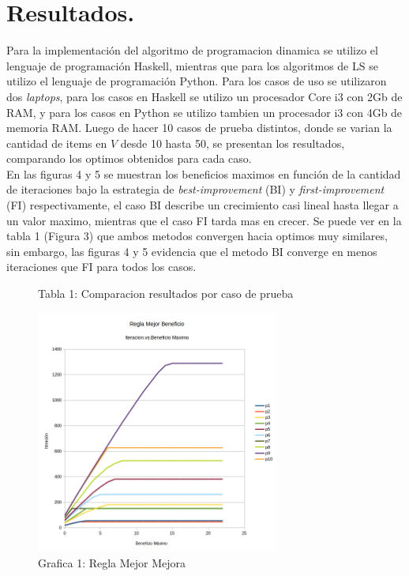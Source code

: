 \documentclass{ci5652}
\begin{document}
\section{Resultados.}
	Para la implementación del algoritmo de programacion dinamica se utilizo el lenguaje de programación Haskell, mientras que para los algoritmos de LS se utilizo el lenguaje de programación Python. Para los casos de uso se utilizaron dos \textit{laptops}, para los casos en Haskell se utilizo un procesador Core i3 con 2Gb de RAM, y para los casos en Python se utilizo tambien un procesador i3 con 4Gb de memoria RAM. Luego de hacer 10 casos de prueba distintos, donde se varian la cantidad de items en $V$ desde 10 hasta 50, se presentan los resultados, comparando los optimos obtenidos para cada caso.\\
	En las figuras 4 y 5 se muestran los beneficios maximos en función de la cantidad de iteraciones bajo la estrategia de \textit{best-improvement} (BI) y \textit{first-improvement} (FI) respectivamente, el caso BI describe un crecimiento casi lineal hasta llegar a un valor maximo, mientras que el caso FI tarda mas en crecer. Se puede ver en la tabla 1 (Figura 3) que ambos metodos convergen hacia optimos muy similares, sin embargo, las figuras 4 y 5 evidencia que el metodo BI converge en menos iteraciones que FI para todos los casos.

 	\begin{figure}[h]
	 	\caption{Tabla 1: Comparacion resultados por caso de prueba}


	\end{figure}

 	\begin{figure}[h]
 	\caption{Grafica 1: Regla Mejor Mejora}
	
	\includegraphics[width=8cm, height=8cm]{best_imp-it-vs-ben_max.png}
	\end{figure}
\end{document}
